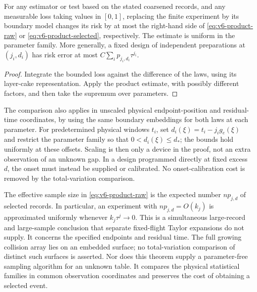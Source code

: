 \begin{corollary}\label{cor:v6-risk}
For any estimator or test based on the stated coarsened records, and any
measurable loss taking values in $[0,1]$, replacing the finite experiment
by its boundary model changes its risk by at most the right-hand side
of \eqref{eq:v6-product-raw} or \eqref{eq:v6-product-selected}, respectively.
The estimate is uniform in the parameter family. More generally, a
fixed design of independent preparations at $(j_i,d_i)$ has risk error
at most $C\sum_i p_{j_i,d_i}\tau^{j_i}$.
\end{corollary}
\begin{proof}
Integrate the bounded loss against the difference of the laws, using
its layer-cake representation. Apply the product estimate, with possibly
different factors, and then take the supremum over parameters.
\end{proof}

The comparison also applies in unscaled physical endpoint-position and
residual-time coordinates, by using the same boundary embeddings for
both laws at each parameter. For predetermined physical windows $t_i$,
set $d_i(\xi)=t_i-j_i g_e(\xi)$ and restrict the parameter family so that
$0<d_i(\xi)\le d_*$; the bounds hold uniformly at these offsets. Scaling
is then only a device in the proof, not an extra observation of an
unknown gap. In a design programmed directly at fixed excess $d$, the
onset must instead be supplied or calibrated. No onset-calibration cost
is removed by the total-variation comparison.

The effective sample size in \eqref{eq:v6-product-raw} is the expected
number $np_{j,d}$ of selected records. In particular, an experiment with
$np_{j,d}=O(k_j)$ is approximated uniformly whenever $k_j\tau^j\to0$.
This is a simultaneous large-record and large-sample conclusion that
separate fixed-flight Taylor expansions do not supply. It concerns the
specified endpoints and residual time. The full growing collision array
lies on an embedded surface; no total-variation comparison of distinct
such surfaces is asserted. Nor does this theorem supply a
parameter-free sampling algorithm for an unknown table. It compares the
physical statistical families in common observation coordinates and
preserves the cost of obtaining a selected event.
